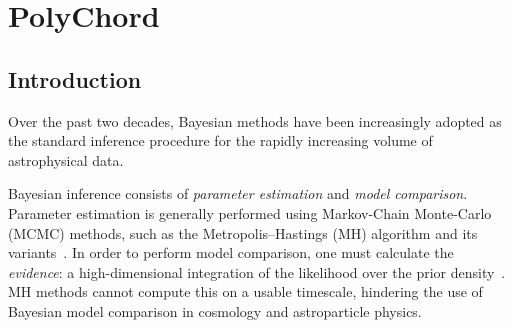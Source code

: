 \newcommand{\smin}{\mathrm{min}}         %
\newcommand{\smax}{\mathrm{max}}         %
\newcommand{\slive}{\mathrm{live}}       %
\newcommand{\sdead}{\mathrm{dead}}       %
\newcommand{\sphantom}{\mathrm{phantom}} %
\newcommand{\sprocs}{\mathrm{procs}}     %
\newcommand{\sdims}{\mathrm{dims}}       %
\newcommand{\srepeats}{\mathrm{repeats}} %
\newcommand{\sshell}{\mathrm{shell}} %

\newcommand{\nlive}{n_\slive}       %
\newcommand{\nphantom}{n_\sphantom} %
\newcommand{\ndims}{n_\sdims}       %
\newcommand{\nprocs}{n_\sprocs}     %
\newcommand{\nlike}{N_\lik}         %
\newcommand{\nrepeats}{n_\srepeats} %

\newcommand{\nhatx}{\mathbf{\hat{n}}}        %
\newcommand{\nhat}[1]{\nhatx_{#1}} %
\newcommand{\bxx}{\mathbf{x}}                %
\newcommand{\bmew}{\mathbf{\mu}}                %
\newcommand{\bzero}{\mathbf{0}}                %
\newcommand{\byy}{\mathbf{y}}                %
\newcommand{\bFF}{\mathbf{F}}                %
\newcommand{\bx}[1]{\bxx_{#1}}         %

\newcommand{\mean}[1]{{\left\langle{#1}\right\rangle}}
\newcommand{\bigO}[1]{{\sim\mathcal{O}{\left(#1\right)}}}



\chapter{PolyChord}
\label{chap:pc}

\section{Introduction}
\label{sec:pc:introduction}
Over the past two decades, Bayesian methods have been increasingly adopted as the standard inference procedure for the rapidly increasing volume of astrophysical data.

Bayesian inference consists of {\em parameter estimation\/} and {\em model comparison}.  Parameter estimation is generally performed using Markov-Chain Monte-Carlo (MCMC) methods, such as the Metropolis--Hastings (MH) algorithm and its variants~\citep{Mackay}.  In order to perform model comparison, one must calculate the {\em evidence\/}: a high-dimensional integration of the likelihood over the prior density~\citep{Sivia}.  MH methods cannot compute this on a usable timescale, hindering the use of Bayesian model comparison in cosmology and astroparticle physics.

